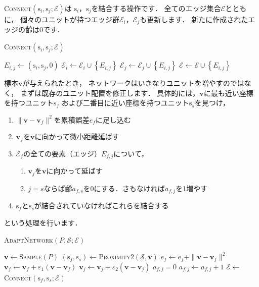 ﻿\documentclass{jsarticle}
\begin{document}
\textsc{Connect}$\left(\mathrm{s}_{i}, \mathrm{s}_{j};\mathcal{E}\right)$は
$\mathrm{s}_{i}$，$\mathrm{s}_{j}$を結合する操作です．
全てのエッジ集合$\mathcal{E}$とともに，
個々のユニットが持つエッジ群$\mathcal{E}_{i}$，$\mathcal{E}_{j}$も更新します．
新たに作成されたエッジの齢は0です．

\begin{algorithm}[tbh]
\caption{\textsc{Connect}$\left(\mathrm{s}_{i}, \mathrm{s}_{j};\mathcal{E}\right)$}
\begin{algorithmic}[1]
\State $E_{i,j}\leftarrow\left(\mathrm{s}_{i}, \mathrm{s}_{j}, 0\right)$
\State $\mathcal{E}_{i}\leftarrow\mathcal{E}_{i}\cup\left\{E_{i,j}\right\}$
\State $\mathcal{E}_{j}\leftarrow\mathcal{E}_{j}\cup\left\{E_{i,j}\right\}$
\State $\mathcal{E}\leftarrow\mathcal{E}\cup\left\{E_{i,j}\right\}$
\EndIf
\end{algorithmic}
\end{algorithm}




標本$\bm{v}$が与えられたとき，
ネットワークはいきなりユニットを増やすのではなく，
まずは既存のユニット配置を修正します．
具体的には，$\bm{v}$に最も近い座標を持つユニット$\mathrm{s}_{f}$
および二番目に近い座標を持つユニット$\mathrm{s}_{s}$を見つけ，
\begin{enumerate}
\item{$\|\bm{v}-\bm{v}_{f}\|^{2}$を累積誤差$e_{f}$に足し込む}
\item{$\bm{v}_{f}$を$\bm{v}$に向かって微小距離延ばす}
\item{$\mathcal{E}_{f}$の全ての要素（エッジ）$E_{f,j}$について，
\begin{enumerate}
 \item{$\bm{v}_{j}$を$\bm{v}$に向かって延ばす}
 \item{$j=s$ならば齢$a_{f,s}$を0にする．さもなければ$a_{f,j}$を1増やす}
\end{enumerate}
}
\item{$\mathrm{s}_{f}$と$\mathrm{s}_{s}$が結合されていなければこれらを結合する}
\end{enumerate}
という処理を行います．

\begin{algorithm}[tbh]
\caption{\textsc{AdaptNetwork}$(P,\mathcal{S};\mathcal{E})$}
\begin{algorithmic}[1]
\State $\bm{v}\leftarrow$\textsc{Sample}$(P)$
\State $(\mathrm{s}_{f}, \mathrm{s}_{s})\leftarrow$\textsc{Proximity2}$(\mathcal{S}, \bm{v})$
\State $e_{f}\leftarrow e_{f} + \|\bm{v}-\bm{v}_{f}\|^{2}$
\State $\bm{v}_{f}\leftarrow\bm{v}_{f}+\varepsilon_{1}(\bm{v}-\bm{v}_{f})$
  \State $\bm{v}_{j}\leftarrow\bm{v}_{j}+\varepsilon_{2}(\bm{v}-\bm{v}_{j})$
    \State $a_{f,j}=0$
  \Else
    \State $a_{f,j}\leftarrow a_{f,j}+1$
  \EndIf
\EndFor
{}
  \State $\mathcal{E}\leftarrow$\textsc{Connect}$(\mathrm{s}_{f},\mathrm{s}_{s};\mathcal{E})$
\EndIf
\end{algorithmic}
\end{algorithm}
\end{document}
